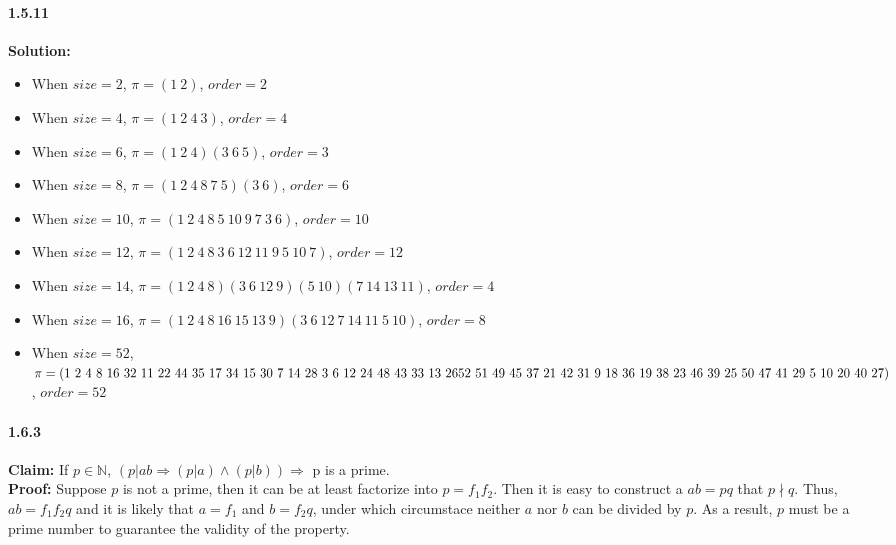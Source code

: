 \documentclass[11pt]{article}
\begin{document}
\paragraph{1.5.11}\textbf{Solution:}
    \begin{itemize}
        \item When $size = 2$, $\pi = (1\ 2)$, $order = 2$
        \item When $size = 4$, $\pi = (1\ 2\ 4\ 3)$, $order = 4$
        \item When $size = 6$, $\pi = (1\ 2\ 4)(3\ 6\ 5)$, $order = 3$
        \item When $size = 8$, $\pi = (1\ 2\ 4\ 8\ 7\ 5)(3\ 6)$, $order = 6$
        \item When $size = 10$, $\pi = (1\ 2\ 4\ 8\ 5\ 10\ 9\ 7\ 3\ 6)$, $order = 10$
        \item When $size = 12$, $\pi = (1\ 2\ 4\ 8\ 3\ 6\ 12\ 11\ 9\ 5\ 10\ 7)$, $order = 12$
        \item When $size = 14$, $\pi = (1\ 2\ 4\ 8)(3\ 6\ 12\ 9)(5\ 10)(7\ 14\ 13\ 11)$, $order = 4$
        \item When $size = 16$, $\pi = (1\ 2\ 4\ 8\ 16\ 15\ 13\ 9)(3\ 6\ 12\ 7\ 14\ 11\ 5\ 10)$, $order = 8$
        \item When $size = 52$, $\pi = (1\ 2\ 4\ 8\ 16\ 32\ 11\ 22\ 44\ 35\ 17\ 34\ 15\ 30\ 7\ 14\ 28\ 3\ 6\ 12\ 24\ 48\ 43\ 33\ 13\ 26\\ 52\ 51\ 49\ 45\ 37\ 21\ 42\ 31\ 9\ 18\ 36\ 19\ 38\ 23\ 46\ 39\ 25\ 50\ 47\ 41\ 29\ 5\ 10\ 20\ 40\ 27)$, $order = 52$
    \end{itemize}

\paragraph{1.6.3}\textbf{Claim:} If $p \in \mathbb{N}$, $(p | ab \Rightarrow (p | a) \wedge (p | b)) \Rightarrow$ p is a prime.\\

\textbf{Proof: }
Suppose $p$ is not a prime, then it can be at least factorize into $p = f_1f_2$. Then it is easy to construct a $ab = pq$ that $p \nmid q$. Thus, $ab = f_1f_2q$ and it is likely that $a = f_1$ and $b = f_2q$, under which circumstace neither $a$ nor $b$ can be divided by $p$. As a result, $p$ must be a prime number to guarantee the validity of the property.
\end{document}
